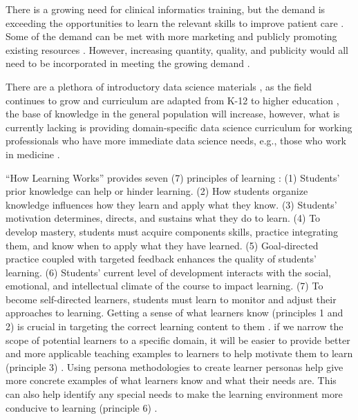 \documentclass[030-workshop.tex]{subfiles}
\begin{document}
    There is a growing need for clinical informatics training,
    but the demand is exceeding the opportunities to learn the relevant skills to improve patient care
    \cite{americanmedicalassociationStudentInterestInformatics, banerjeeMedicalStudentAwareness2015}.
    Some of the demand can be met with more marketing and publicly promoting existing resources
    \cite{banerjeeMedicalStudentAwareness2015}.
    However, increasing quantity, quality, and publicity would all need to be incorporated
    in meeting the growing demand
    \cite{banerjeeMedicalStudentAwareness2015, payneBiomedicalInformaticsMeets2018}.

    There are a plethora of introductory data science materials
    \cite{krossDemocratizationDataScience2020},
    as the field continues to grow and curriculum are adapted from K-12 to higher education
    \cite{gaise2k12, gaise2016, ccdsc2021, csta2017},
    the base of knowledge in the general population will increase,
    however, what is currently lacking is providing domain-specific data science curriculum
    for working professionals who have more immediate data science needs, e.g., those who work in medicine
    \cite{krossDemocratizationDataScience2020, payneBiomedicalInformaticsMeets2018, dunnBuildingBiomedicalData2017, nationalinstitutesofhealthBigDataKnowledge2013, nationalinstitutesofhealthNIHStrategicPlan2020}.

    ``How Learning Works'' provides seven (7) principles of learning
    \cite{ambrose2010learning}:
    (1) Students' prior knowledge can help or hinder learning.
    (2) How students organize knowledge influences how they learn and apply what they know.
    (3) Students' motivation determines, directs, and sustains what they do to learn.
    (4) To develop mastery, students must acquire components skills, practice integrating them, and know when to apply what they have learned.
    (5) Goal-directed practice coupled with targeted feedback enhances the quality of students' learning.
    (6) Students' current level of development interacts with the social, emotional, and intellectual climate of the course to impact learning.
    (7) To become self-directed learners, students must learn to monitor and adjust their approaches to learning.
    Getting a sense of what learners know (principles 1 and 2) is crucial in targeting
    the correct learning content to them
    \cite{ambrose2010learning, Koch2016, wilson2019teaching}.
    if we narrow the scope of potential learners to a specific domain,
    it will be easier to provide better and more applicable teaching examples to learners
    to help motivate them to learn (principle 3)
    \cite{pruittPersonaLifecycleKeeping2006, schwartzParadoxChoiceWhy2016}.
    Using persona methodologies to create learner personas help give more concrete examples
    of what learners know and what their needs are.
    This can also help identify any special needs to make the learning environment more conducive to learning (principle 6)
    \cite{pruittPersonaLifecycleKeeping2006, schwartzParadoxChoiceWhy2016, rstudioLearnerPersonas2019}.
\end{document}
